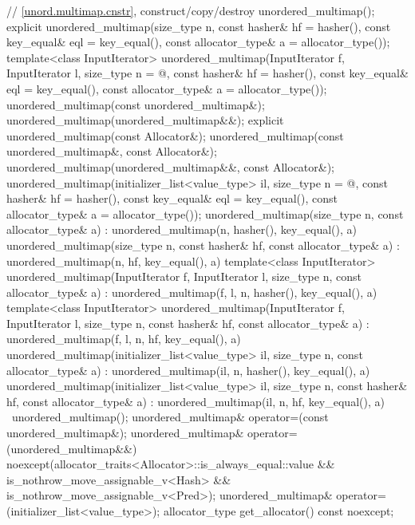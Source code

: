 \begin{codeblock}
{{    // \ref{unord.multimap.cnstr}, construct/copy/destroy
    unordered_multimap();
    explicit unordered_multimap(size_type n,
                                const hasher& hf = hasher(),
                                const key_equal& eql = key_equal(),
                                const allocator_type& a = allocator_type());
    template<class InputIterator>
      unordered_multimap(InputIterator f, InputIterator l,
                         size_type n = @\seebelow@,
                         const hasher& hf = hasher(),
                         const key_equal& eql = key_equal(),
                         const allocator_type& a = allocator_type());
    unordered_multimap(const unordered_multimap&);
    unordered_multimap(unordered_multimap&&);
    explicit unordered_multimap(const Allocator&);
    unordered_multimap(const unordered_multimap&, const Allocator&);
    unordered_multimap(unordered_multimap&&, const Allocator&);
    unordered_multimap(initializer_list<value_type> il,
                       size_type n = @\seebelow@,
                       const hasher& hf = hasher(),
                       const key_equal& eql = key_equal(),
                       const allocator_type& a = allocator_type());
    unordered_multimap(size_type n, const allocator_type& a)
      : unordered_multimap(n, hasher(), key_equal(), a) { }
    unordered_multimap(size_type n, const hasher& hf, const allocator_type& a)
      : unordered_multimap(n, hf, key_equal(), a) { }
    template<class InputIterator>
      unordered_multimap(InputIterator f, InputIterator l, size_type n, const allocator_type& a)
        : unordered_multimap(f, l, n, hasher(), key_equal(), a) { }
    template<class InputIterator>
      unordered_multimap(InputIterator f, InputIterator l, size_type n, const hasher& hf,
                         const allocator_type& a)
        : unordered_multimap(f, l, n, hf, key_equal(), a) { }
    unordered_multimap(initializer_list<value_type> il, size_type n, const allocator_type& a)
      : unordered_multimap(il, n, hasher(), key_equal(), a) { }
    unordered_multimap(initializer_list<value_type> il, size_type n, const hasher& hf,
                       const allocator_type& a)
      : unordered_multimap(il, n, hf, key_equal(), a) { }
    ~unordered_multimap();
    unordered_multimap& operator=(const unordered_multimap&);
    unordered_multimap& operator=(unordered_multimap&&)
      noexcept(allocator_traits<Allocator>::is_always_equal::value &&
               is_nothrow_move_assignable_v<Hash> &&
               is_nothrow_move_assignable_v<Pred>);
    unordered_multimap& operator=(initializer_list<value_type>);
    allocator_type get_allocator() const noexcept;

}}
\end{codeblock}
